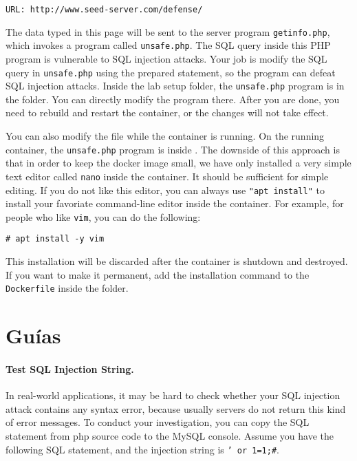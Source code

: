 \begin{lstlisting}
URL: http://www.seed-server.com/defense/
\end{lstlisting}

The data typed in this page will be sent to the 
server program \texttt{getinfo.php}, which 
invokes a program called \texttt{unsafe.php}. 
The SQL query inside this PHP program 
is vulnerable to SQL injection attacks. Your job is modify the SQL 
query in \texttt{unsafe.php} using the prepared statement, so
the program can defeat SQL injection attacks.
Inside the lab setup folder, the \texttt{unsafe.php} program is 
in the  folder. You can directly 
modify the program there. After you are done, you need
to rebuild and restart the container, or the changes will not
take effect. 

You can also modify the file while the container is running.
On the running container, the \texttt{unsafe.php} program is 
inside . 
The downside of this
approach is that in order to keep the docker image small,
we have only installed a very simple text editor called \texttt{nano}
inside the container. It should be sufficient for simple editing.
If you do not like this editor, you can always use \texttt{"apt install"} to install
your favoriate command-line editor inside the container. For example,
for people who like \texttt{vim}, you can do the following:

\begin{lstlisting}
# apt install -y vim 
\end{lstlisting}

This installation will be discarded after the container is shutdown and destroyed.
If you want to make it permanent, add the installation command to the \texttt{Dockerfile} 
inside the  folder. 
 


\section{Guías}
\label{sec:guidelines}

\paragraph{Test SQL Injection String.}
In real-world applications, it may be hard to check whether your SQL injection attack contains
any syntax error, because usually servers do not return this kind of error messages. 
To conduct your investigation, you can copy the SQL statement from php source code to the MySQL console. 
Assume you have the following SQL statement, and the injection string is {\tt ' or 1=1;\#}. 


